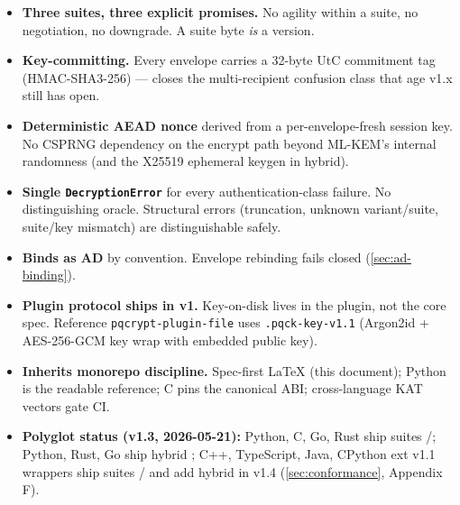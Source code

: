 \begin{calloutinfo}[At a glance]
\begin{itemize}
\item \textbf{Three suites, three explicit promises.} No agility within a suite, no negotiation, no downgrade. A suite byte \emph{is} a version.
\item \textbf{Key-committing.} Every envelope carries a 32-byte UtC commitment tag (HMAC-SHA3-256) --- closes the multi-recipient confusion class that age v1.x still has open.
\item \textbf{Deterministic AEAD nonce} derived from a per-envelope-fresh session key. No CSPRNG dependency on the encrypt path beyond ML-KEM's internal  randomness (and the X25519 ephemeral keygen in hybrid).
\item \textbf{Single \texttt{DecryptionError}} for every authentication-class failure. No distinguishing oracle. Structural errors (truncation, unknown variant/suite, suite/key mismatch) are distinguishable safely.
\item \textbf{Binds \pqid{} as AD} by convention. Envelope rebinding fails closed (\cref{sec:ad-binding}).
\item \textbf{Plugin protocol ships in v1.} Key-on-disk lives in the plugin, not the core spec. Reference \texttt{pqcrypt-plugin-file} uses \texttt{.pqck-key-v1.1} (Argon2id \citep{rfc9106} + AES-256-GCM key wrap with embedded public key).
\item \textbf{Inherits monorepo discipline.} Spec-first LaTeX (this document); Python is the readable reference; C pins the canonical ABI; cross-language KAT vectors gate CI.
\item \textbf{Polyglot status (v1.3, 2026-05-21):} Python, C, Go, Rust ship suites /; Python, Rust, Go ship hybrid ; C++, TypeScript, Java, CPython ext v1.1 wrappers ship suites / and add hybrid in v1.4 (\cref{sec:conformance}, Appendix F).
\end{itemize}
\end{calloutinfo}
